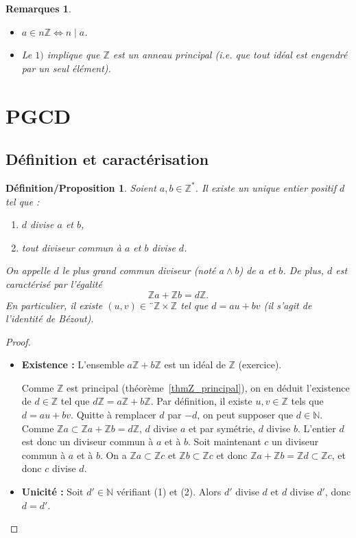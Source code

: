 \documentclass[12pt]{report}
\newtheorem*{rems}{Remarques}
\newtheorem{Def/prop}[thm]{Définition/Proposition}
\newcommand{\N}{\mathbb{N}}
\newcommand{\Z}{\mathbb{Z}}
\begin{document}
\begin{rems}\
\begin{itemize}
\item[•] $a \in n \mathbb{Z} \Longleftrightarrow n \mid a $.
\item[•] Le $1)$ implique que $\mathbb{Z}$ est un anneau principal (i.e. que tout idéal est engendré par un seul élément). 
\end{itemize}
\end{rems}



\section{PGCD}

\subsection{Définition et caractérisation}

\begin{Def/prop}\label{def_prop_PGCD}
Soient $a,b \in \mathbb{Z}^*$.  Il existe un unique entier positif $d$ tel que : \begin{enumerate}
\item $d$ divise $a$ et $b$,

\item tout diviseur commun à $a$ et $b$ divise $d$.
\end{enumerate} On appelle  $d$ le plus grand commun diviseur (noté $a\wedge b$) de $a$ et $b$. De plus, $d$ est caractérisé par l'égalité  \[\Z a +\Z b=d\Z.\] En particulier, il existe $(u,v)\in¨ \Z\times \Z$ tel que $d=au+bv$ (il s'agit de l'identité de Bézout).
\end{Def/prop}

\begin{proof}
\begin{itemize}
\item[$\bullet$]\textbf{Existence :} L'ensemble $a \mathbb{Z}+b \mathbb{Z}$ est un idéal de $\mathbb{Z}$ (exercice).\par 
Comme $\Z$ est principal (théorème~\ref{thmZ_principal}), on en déduit l'existence de $d\in \Z$ tel que $d\Z=a\Z+b\Z$. Par définition, il existe $u,v\in \Z$ tels que $d=au+bv$. Quitte à remplacer $d$ par $-d$, on peut supposer que $d\in \N$. Comme $\Z a\subset \Z a+\Z b=d\Z$, $d$ divise $a$ et par symétrie, $d$ divise $b$. L'entier $d$ est donc un diviseur commun à $a$ et à $b$. Soit maintenant $c$ un diviseur commun à $a$ et à $b$. On a $\Z a\subset \Z c$ et $\Z b\subset \Z c$ et donc $\Z a +\Z b=\Z d\subset \Z c$, et donc $c$ divise $d$.

\item[$\bullet$]\textbf{Unicité :} Soit $d'\in \N$ vérifiant (1) et (2). Alors $d'$ divise $d$ et $d$ divise $d'$, donc $d=d'$.
\end{itemize}

\end{proof}
\end{document}
